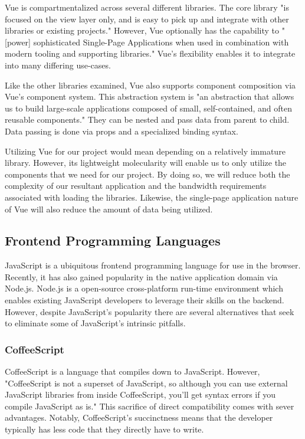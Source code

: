 \documentclass[12pt]{report}
\begin{document}
Vue is compartmentalized across several different libraries. The core library "is focused on the view layer only, and is easy to pick up and integrate with other libraries or existing projects." \cite{vueguide} However, Vue optionally has the capability to "[power] sophisticated Single-Page Applications when used in combination with modern tooling and supporting libraries."\cite{vueguide} Vue's flexibility enables it to integrate into many differing use-cases.

Like the other libraries examined, Vue also supports component composition via Vue's component system. This abstraction system is "an abstraction that allows us to build large-scale applications composed of small, self-contained, and often reusable components."\cite{vueguide} They can be nested and pass data from parent to child. Data passing is done via props and a specialized binding syntax.

Utilizing Vue for our project would mean depending on a relatively immature library. However, its lightweight molecularity will enable us to only utilize the components that we need for our project. By doing so, we will reduce both the complexity of our resultant application and the bandwidth requirements associated with loading the libraries. Likewise, the single-page application nature of Vue will also reduce the amount of data being utilized.

\subsection*{Frontend Programming Languages}

JavaScript is a ubiquitous frontend programming language for use in the browser. Recently, it has also gained popularity in the native application domain via Node.js. Node.js is a open-source cross-platform run-time environment which enables existing JavaScript developers to leverage their skills on the backend. However, despite JavaScript's popularity there are several alternatives that seek to eliminate some of JavaScript's intrinsic pitfalls.

\subsubsection*{CoffeeScript}

CoffeeScript is a language that compiles down to JavaScript.\cite{coffeescriptlittlebook} However, "CoffeeScript is not a superset of JavaScript, so although you can use external JavaScript libraries from inside CoffeeScript, you'll get syntax errors if you compile JavaScript as is."\cite{coffeescriptlittlebook} This sacrifice of direct compatibility comes with sever advantages. Notably, CoffeeScript's succinctness means that the developer typically has less code that they directly have to write.
\end{document}
